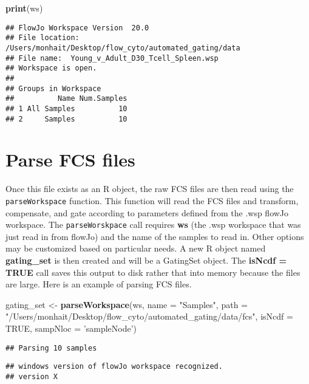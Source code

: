 \documentclass[]{book}
\newenvironment{Shaded}{\begin{snugshade}}{\end{snugshade}}
\newcommand{\DataTypeTok}[1]{\textcolor[rgb]{0.13,0.29,0.53}{#1}}
\newcommand{\KeywordTok}[1]{\textcolor[rgb]{0.13,0.29,0.53}{\textbf{#1}}}
\newcommand{\NormalTok}[1]{#1}
\newcommand{\OtherTok}[1]{\textcolor[rgb]{0.56,0.35,0.01}{#1}}
\newcommand{\StringTok}[1]{\textcolor[rgb]{0.31,0.60,0.02}{#1}}
\begin{document}
\begin{Shaded}
\begin{Highlighting}[]
\KeywordTok{print}\NormalTok{(ws)}
\end{Highlighting}
\end{Shaded}

\begin{verbatim}
## FlowJo Workspace Version  20.0 
## File location:  /Users/monhait/Desktop/flow_cyto/automated_gating/data 
## File name:  Young_v_Adult_D30_Tcell_Spleen.wsp 
## Workspace is open. 
## 
## Groups in Workspace
##          Name Num.Samples
## 1 All Samples          10
## 2     Samples          10
\end{verbatim}

\hypertarget{parse-fcs-files}{%
\section{Parse FCS files}\label{parse-fcs-files}}

Once this file exists as an R object, the raw FCS files are then read using the \texttt{parseWorkspace} function. This function will read the FCS files and transform, compensate, and gate according to parameters defined from the .wsp flowJo workspace. The \texttt{parseWorskpace} call requires \textbf{ws} (the .wsp workspace that was just read in from flowJo) and the name of the samples to read in. Other options may be customized based on particular needs. A new R object named \textbf{gating\_set} is then created and will be a GatingSet object. The \textbf{isNcdf = TRUE} call saves this output to disk rather that into memory because the files are large. Here is an example of parsing FCS files.

\begin{Shaded}
\begin{Highlighting}[]
\NormalTok{gating_set <-}\StringTok{ }\KeywordTok{parseWorkspace}\NormalTok{(ws, }\DataTypeTok{name =} \StringTok{"Samples"}\NormalTok{, }\DataTypeTok{path =} \StringTok{"/Users/monhait/Desktop/flow_cyto/automated_gating/data/fcs"}\NormalTok{, }\DataTypeTok{isNcdf =} \OtherTok{TRUE}\NormalTok{, }\DataTypeTok{sampNloc =} \StringTok{'sampleNode'}\NormalTok{)}
\end{Highlighting}
\end{Shaded}

\begin{verbatim}
## Parsing 10 samples
\end{verbatim}

\begin{verbatim}
## windows version of flowJo workspace recognized.
## version X
\end{verbatim}
\end{document}
